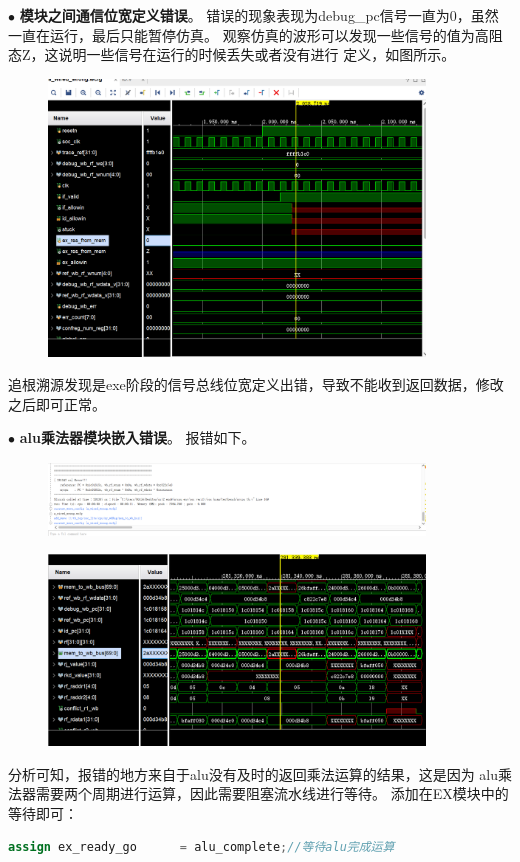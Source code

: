 \documentclass[11pt]{article}
\begin{document}
\noindent
$\bullet$
\textbf{模块之间通信位宽定义错误}。
错误的现象表现为debug_pc信号一直为0，虽然一直在运行，最后只能暂停仿真。
观察仿真的波形可以发现一些信号的值为高阻态Z，这说明一些信号在运行的时候丢失或者没有进行
定义，如图所示。
\begin{figure}[h]
  \centering
  \includegraphics[width=10cm]{fig/1.png}
\end{figure}
追根溯源发现是exe阶段的信号总线位宽定义出错，导致不能收到返回数据，修改之后即可正常。

\vspace{1ex}

\noindent
$\bullet$
\textbf{alu乘法器模块嵌入错误}。
报错如下。
\begin{figure}[H]
  \centering
  \includegraphics[width=10cm]{fig/2.png}
\end{figure}
\begin{figure}[H]
  \centering
  \includegraphics[width=10cm]{fig/3.png}
\end{figure}

分析可知，报错的地方来自于alu没有及时的返回乘法运算的结果，这是因为
alu乘法器需要两个周期进行运算，因此需要阻塞流水线进行等待。
添加在EX模块中的等待即可：
\begin{lstlisting}[language=verilog]
  assign ex_ready_go      = alu_complete;//等待alu完成运算
\end{lstlisting}
\end{document}
